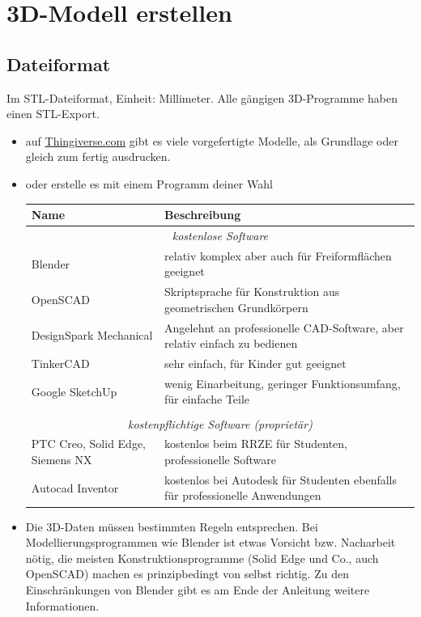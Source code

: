 \documentclass{\basedir/fablab-document}
\begin{document}
\newpage

\renewcommand{\contentsname}{Inhaltsverzeichnis / Arbeitsablauf}
\setcounter{tocdepth}{2}
\tableofcontents
\newpage

\section{3D-Modell erstellen}
\subsection{Dateiformat}

Im STL-Dateiformat, Einheit: Millimeter. Alle gängigen 3D-Programme haben einen STL-Export.

\begin{itemize}
\item auf \href{https://thingiverse.com}{Thingiverse.com} gibt es viele vorgefertigte Modelle, als
Grundlage oder gleich zum fertig ausdrucken.
\item oder erstelle es mit einem Programm deiner Wahl
\begin{table}[H]
\centering
\begin{tabularx}{\textwidth}{|l|X|}
\hline \textbf{Name} & \textbf{Beschreibung} \\
\hline \multicolumn{2}{|c|}{\textit{kostenlose Software}}  \\
\hline Blender & relativ komplex aber auch für Freiformflächen geeignet  \\
\hline OpenSCAD & Skriptsprache für Konstruktion aus geometrischen Grundkörpern \\
\hline DesignSpark Mechanical & Angelehnt an professionelle CAD-Software, aber relativ einfach zu bedienen  \\
\hline TinkerCAD & sehr einfach, für Kinder gut geeignet  \\
\hline Google SketchUp & wenig Einarbeitung, geringer Funktionsumfang, für einfache Teile \\
\hline & \\
\hline \multicolumn{2}{|c|}{\textit{kostenpflichtige Software (proprietär)}}  \\
\hline PTC Creo, Solid Edge, Siemens NX & kostenlos beim RRZE für Studenten, professionelle Software \\
\hline Autocad Inventor & kostenlos bei Autodesk für Studenten ebenfalls für professionelle Anwendungen \\
\hline
\end{tabularx}
\end{table}
\item Die 3D-Daten müssen bestimmten Regeln entsprechen. Bei Modellierungsprogrammen wie Blender ist etwas Vorsicht bzw. Nacharbeit nötig, die meisten Konstruktionsprogramme (Solid Edge und Co., auch OpenSCAD) machen es prinzipbedingt von selbst richtig. Zu den Einschränkungen von Blender gibt es am Ende der Anleitung weitere Informationen.
\end{itemize}
\end{document}
